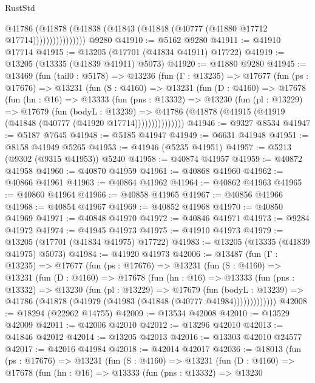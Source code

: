 \begin{lexlean}{RustStd}
\begin{coremodule}
                      @41786
                        (@41878
                          (@41838 (@41843 (@41848 (@40777 (@41880 @17712 @17714))))))))))))))))
    @9280
@41910 := @5162 @9280
@41911 := @41910 @17714
@41915 := @13205 (@17701 (@41834 @41911) @17722)
@41919 := @13205 (@13335 (@41839 @41911) @5073)
@41920 := @41880 @9280
@41945 := @13469
    (fun (tail0 : @5178) =>
    @13236
      (fun (Γ : @13235) =>
      @17677
        (fun (ps : @17676) =>
        @13231
          (fun (S : @4160) =>
          @13231
            (fun (D : @4160) =>
            @17678
              (fun (hn : @16) =>
              @13333
                (fun (pns : @13332) =>
                @13230
                  (fun (pl : @13229) =>
                  @17679
                    (fun (bodyL : @13239) =>
                    @41786 (@41878 (@41915 (@41919 (@41848 (@40777 (@41920 @17714)))))))))))))))
@41946 := @9327 @8534
@41947 := @5187 @7645
@41948 := @5185 @41947
@41949 := @6631 @41948
@41951 := @8158 @41949 @5265
@41953 := @41946 (@5235 @41951)
@41957 := @5213 (@9302 (@9315 @41953)) @5240
@41958 := @40874 @41957
@41959 := @40872 @41958
@41960 := @40870 @41959
@41961 := @40868 @41960
@41962 := @40866 @41961
@41963 := @40864 @41962
@41964 := @40862 @41963
@41965 := @40860 @41964
@41966 := @40858 @41965
@41967 := @40856 @41966
@41968 := @40854 @41967
@41969 := @40852 @41968
@41970 := @40850 @41969
@41971 := @40848 @41970
@41972 := @40846 @41971
@41973 := @9284 @41972
@41974 := @41945 @41973
@41975 := @41910 @41973
@41979 := @13205 (@17701 (@41834 @41975) @17722)
@41983 := @13205 (@13335 (@41839 @41975) @5073)
@41984 := @41920 @41973
@42006 := @13487
    (fun (Γ : @13235) =>
    @17677
      (fun (ps : @17676) =>
      @13231
        (fun (S : @4160) =>
        @13231
          (fun (D : @4160) =>
          @17678
            (fun (hn : @16) =>
            @13333
              (fun (pns : @13332) =>
              @13230
                (fun (pl : @13229) =>
                @17679
                  (fun (bodyL : @13239) =>
                  @41786 (@41878 (@41979 (@41983 (@41848 (@40777 @41984)))))))))))))
@42008 := @18294 (@22962 @14755)
@42009 := @13534 @42008
@42010 := @13529 @42009
@42011 := @42006 @42010
@42012 := @13296 @42010
@42013 := @41846 @42012
@42014 := @13205 @42013
@42016 := @13303 @42010 @24577
@42017 := @42016 @41984
@42018 := @42014 @42017
@42036 := @18013
    (fun (ps : @17676) =>
    @13231
      (fun (S : @4160) =>
      @13231
        (fun (D : @4160) =>
        @17678
          (fun (hn : @16) =>
          @13333
            (fun (pns : @13332) =>
            @13230

\end{coremodule}
\end{lexlean}
